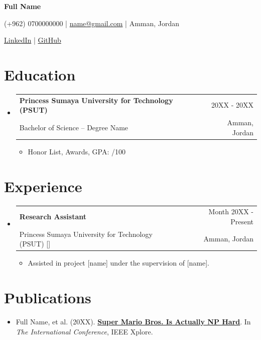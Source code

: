 \documentclass[a4paper,11pt]{article}
\makeatletter
\newcommand{\resumeSubheading}[4]{
\vspace{1mm}\item
    \begin{tabular*}{0.98\textwidth}[t]{l@{\extracolsep{\fill}}r}
        \textbf{#1} & {\footnotesize{#4}} \\
        {\footnotesize{#3}} &  \footnotesize{#2}\\
    \end{tabular*}
    \vspace{-1.6mm}
}
\newcommand{\resumeSubHeadingListStart}{\begin{itemize}[leftmargin=*,labelsep=1mm]}
\newcommand{\resumeItemListStart}{\begin{itemize}[leftmargin=*,labelsep=1mm,itemsep=0.5mm]}
\newcommand{\resumeSubHeadingListEnd}{\end{itemize}\vspace{2mm}}
\newcommand{\resumeItemListEnd}{\end{itemize}\vspace{-1mm}}
\newcommand{\socialicon}[1]{\raisebox{-0.05em}{\resizebox{!}{1em}{#1}}}
\newcommand{\headerfontiii}{\fontfamily{ppl}\selectfont} %
\makeatother
\begin{document}
\headerfontiii

\begin{center}
    {\Huge\textbf{Full Name}}
\end{center}
\vspace{-6mm}

\begin{center}
    \small{
    (+962) 0700000000 | \href{mailto:name@gmail.com}{name@gmail.com} |
    \small{Amman, Jordan}
    }
\end{center}
\vspace{-6mm}

\begin{center}
    \small{
    \socialicon{\faLinkedin} \href{http://www.linkedin.com}{LinkedIn} | 
    \socialicon{\faGithub} \href{https://github.com}{GitHub} 
    }
\end{center}

\vspace{-4mm}

\section{\textbf{Education}}
\vspace{-0.4mm}
\resumeSubHeadingListStart

\resumeSubheading
{Princess Sumaya University for Technology (PSUT)}{Amman, Jordan}
{Bachelor of Science – Degree Name }{20XX - 20XX}
\resumeItemListStart
\setlength\itemindent{1em}
\item Honor List, Awards, GPA: /100 
\resumeItemListEnd

\resumeSubHeadingListEnd
\vspace{-6mm}

\section{\textbf{Experience}}
\vspace{-0.4mm}
  \resumeSubHeadingListStart
  \resumeSubheading
      {{Research Assistant}}{Amman, Jordan}
      {Princess Sumaya University for Technology (PSUT) [\href{https://www.psut.edu.jo/}{\faIcon{globe}}]}{Month 20XX - Present}
      \resumeItemListStart
      \setlength\itemindent{1em}
        \item Assisted in project [name] under the supervision of [name].
      \resumeItemListEnd 
\resumeSubHeadingListEnd
\vspace{-6mm}

\section{\textbf{Publications}}
\vspace{0.2mm}
\small{
\begin{itemize}[leftmargin=1em]
  \item Full Name, et al. (20XX). \href{https://ieeexplore.ieee.org}{\textbf{Super Mario Bros. Is Actually NP Hard}}. In \textit{The International Conference}, IEEE Xplore.
\end{itemize}
}
\end{document}
